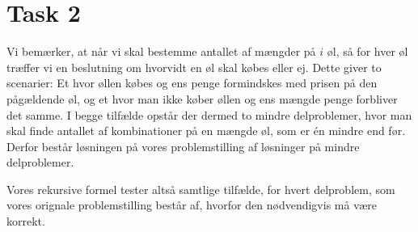 \section{Task 2}

Vi bemærker, at når vi skal bestemme antallet af mængder på $i$ øl,
så for hver øl træffer vi en beslutning om hvorvidt en øl skal købes eller ej.
Dette giver to scenarier: Et hvor øllen købes og ens penge formindskes med prisen på den pågældende øl, og et hvor man ikke køber øllen og ens mængde penge forbliver det samme. I begge tilfælde opstår der dermed to mindre delproblemer,
hvor man skal finde antallet af kombinationer på en mængde øl, som er én mindre end før. Derfor består løsningen på vores problemstilling af løsninger på mindre delproblemer.

Vores rekursive formel tester altså samtlige tilfælde, for hvert delproblem, som vores orignale problemstilling består af, hvorfor den nødvendigvis må være korrekt.

